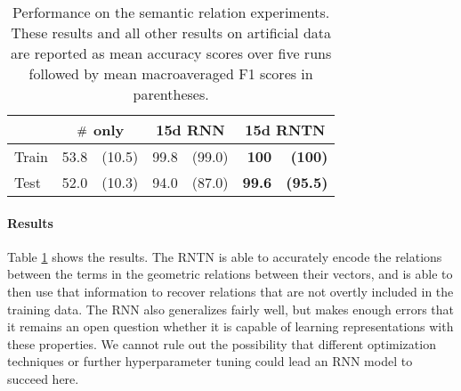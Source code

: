 \begin{table}[tp]
  \centering \small
  \begin{tabular}{ l r@{ \ }r r@{ \ }r r@{ \ }r }
    \toprule
    ~&\multicolumn{2}{c}{$\mathbin{\#}$ only} & \multicolumn{2}{c}{15d RNN}  & \multicolumn{2}{c}{15d RNTN}\\
    \midrule
    Train &53.8 &(10.5)    & 99.8&	(99.0) & \textbf{100} & \textbf{(100)}\\
    Test &52.0 &(10.3) &	94.0&(87.0)& \textbf{99.6} & \textbf{(95.5)}\\
    \bottomrule
  \end{tabular}
  \caption{Performance on the semantic relation experiments. These results and all other results on artificial data are reported as mean accuracy scores over five runs followed by mean macroaveraged F1 scores in parentheses.}
  \label{joinresultstable}
\end{table}

\paragraph{Results} 
Table \ref{joinresultstable} shows the results. 
The RNTN is able to accurately encode the relations 
between the terms in the geometric relations between their vectors, 
and is able to then use that information to recover relations that 
are not overtly included in the training data. The RNN also generalizes fairly well, 
but makes enough errors that it remains an open question whether 
it is capable of learning representations with these properties. 
We cannot rule out the possibility that different optimization techniques or
further hyperparameter tuning could lead an RNN model to succeed here.



